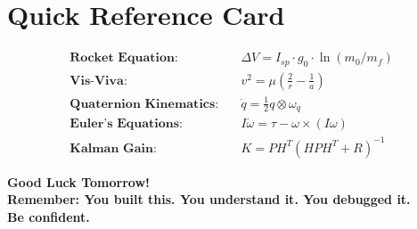 \documentclass[11pt,a4paper]{article}
\begin{document}
\section{Quick Reference Card}

\begin{tcolorbox}[colback=blue!5,colframe=primaryblue,title=Equations to Know]
\begin{align*}
\textbf{Rocket Equation:} \quad & \Delta V = I_{sp} \cdot g_0 \cdot \ln(m_0/m_f) \\[0.5em]
\textbf{Vis-Viva:} \quad & v^2 = \mu\left(\frac{2}{r} - \frac{1}{a}\right) \\[0.5em]
\textbf{Quaternion Kinematics:} \quad & \dot{q} = \frac{1}{2} q \otimes \omega_q \\[0.5em]
\textbf{Euler's Equations:} \quad & I\dot{\omega} = \tau - \omega \times (I\omega) \\[0.5em]
\textbf{Kalman Gain:} \quad & K = PH^T(HPH^T + R)^{-1}
\end{align*}
\end{tcolorbox}

\vspace{1cm}

\begin{center}
\begin{tcolorbox}[colback=green!5,colframe=successgreen,width=0.8\textwidth]
\centering
\Large\bfseries
Good Luck Tomorrow!\\[0.5em]
\normalsize\normalfont
Remember: You built this. You understand it. You debugged it.\\
\textbf{Be confident.}
\end{tcolorbox}
\end{center}
\end{document}
